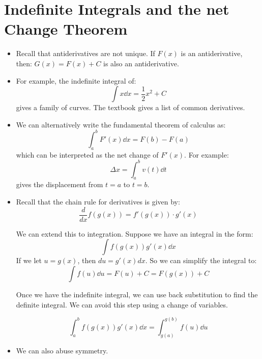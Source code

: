\section{Indefinite Integrals and the net Change Theorem}
\begin{itemize}
    \item Recall that antiderivatives are not unique. If $F(x)$ is an antiderivative, then: $G(x)=F(x)+C$ is also an antiderivative.
    \item For example, the indefinite integral of:
    \begin{equation}
        \int x \dd{x} = \frac{1}{2}x^2 + C
        \label{eq:}
    \end{equation}
    gives a family of curves. The textbook gives a list of common derivatives.
    \item We can alternatively write the fundamental theorem of calculus as:
    \begin{equation}
        \int_a^b F'(x) \dd{x} = F(b)-F(a)
        \label{eq:}
    \end{equation}
    which can be interpreted as the net change of $F'(x)$. For example:
    \begin{equation}
        \Delta x = \int_a^b v(t) \dd{t}
        \label{eq:}
    \end{equation}
    gives the displacement from $t=a$ to $t=b$.
    \item Recall that the chain rule for derivatives is given by:
    \begin{equation}
        \frac{d}{dx}f(g(x)) =f'(g(x))\cdot g'(x)
        \label{eq:}
    \end{equation}
    \begin{idea}
        We can extend this to integration. Suppose we have an integral in the form:
        \begin{equation}
            \int f(g(x))g'(x) \dd{x}
            \label{eq:}
        \end{equation}
        If we let $u=g(x)$, then $du=g'(x) dx$. So we can simplify the integral to:
        \begin{equation}
            \int f(u) \dd{u} = F(u) +C = F(g(x)) + C
            \label{eq:}
        \end{equation}      
    \end{idea}
    Once we have the indefinite integral, we can use back substitution to find the definite integral. We can avoid this step using a change of variables.
    \begin{theorem}
        \begin{equation}
            \int_a^b f(g(x))g'(x)\dd{x} = \int_{g(a)}^{g(b)} f(u) \dd{u}
        \end{equation}
    \end{theorem}
    \item We can also abuse symmetry.
\end{itemize}